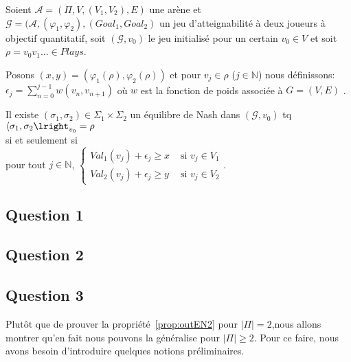 \begin{propriete}
	\label{prop:outEN2}
	Soient $\mathcal{A} = (\Pi, V, (V_{1}, V_{2}), E)$ une arène et $\mathcal{G} = (\mathcal{A}, (\varphi _{1}, \varphi _{2}), (Goal_{1}, Goal_{2})$ un jeu d'atteignabilité à deux joueurs à objectif quantitatif, soit $(\mathcal{G}, v_{0})$ le jeu initialisé pour un certain $v_{0} \in V $ et soit $\rho = v_{0}v_{1}... \in Plays$. 
	
	Posons $(x,y) = (\varphi _{1}(\rho), \varphi _{2}(\rho))$ et pour $v_{j} \in \rho$ ($j \in \mathbb{N}$) nous définissons: $\epsilon _{j} = \sum _{n= 0} ^{j-1} w(v_{n},v_{n+1})$ où $w$ est la fonction de poids associée à $G = (V,E)$ .
	
	\begin{center}Il existe $(\sigma _{1},\sigma _{2}) \in \Sigma _{1} \times \Sigma _{2}$ un équilibre de Nash dans $(\mathcal{G},v_{0})$ tq $\langle \sigma _{1},\sigma _{2}\lright_{v_0} = \rho$\\ $\text{}$\\ si et seulement si\\$\text{}$\\ pour tout $j \in \mathbb{N}$, $\begin{cases}
													Val_{1}(v_{j}) + \epsilon _{j} \geq x & \text{ si } v_{j} \in V_{1} \\
													Val_{2}(v_{j}) + \epsilon _{j} \geq y & \text{ si } v_{j} \in V_{2} 
													\end{cases}$.\end{center}  
\end{propriete}
	
\subsection{Question 1}
\subsection{Question 2}
\subsection{Question 3}
Plutôt que de prouver la propriété~\ref{prop:outEN2} pour $|\Pi|= 2$,nous allons montrer qu'en fait nous pouvons la généralise pour $|\Pi| \geq 2 .$ Pour ce faire, nous avons besoin d'introduire quelques notions préliminaires.


